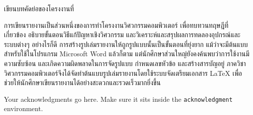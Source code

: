 \maketitle
\makesignature

\ifproject      
  \begin{abstractTH}      
    เขียนบทคัดย่อของโครงงานที่
    
    การเขียนรายงานเป็นส่วนหนึ่งของการทำโครงงานวิศวกรรมคอมพิวเตอร์
    เพื่อทบทวนทฤษฎีที่เกี่ยวข้อง อธิบายขั้นตอนวิธีแก้ปัญหาเชิงวิศวกรรม และวิเคราะห์และสรุปผลการทดลองอุปกรณ์และระบบต่างๆ
    \enskip อย่างไรก็ดี การสร้างรูปเล่มรายงานให้ถูกรูปแบบนั้นเป็นขั้นตอนที่ยุ่งยาก
    แม้ว่าจะมีต้นแบบสำหรับใช้ในโปรแกรม Microsoft Word แล้วก็ตาม
    แต่นักศึกษาส่วนใหญ่ยังคงค้นพบว่าการใช้งานมีความซับซ้อน และเกิดความผิดพลาดในการจัดรูปแบบ กำหนดเลขหัวข้อ และสร้างสารบัญอยู่
    \enskip ภาควิชาวิศวกรรมคอมพิวเตอร์จึงได้จัดทำต้นแบบรูปเล่มรายงานโดยใช้ระบบจัดเตรียมเอกสาร
    \LaTeX{} เพื่อช่วยให้นักศึกษาเขียนรายงานได้อย่างสะดวกและรวดเร็วมากยิ่งขึ้น
  \end{abstractTH}
  
  \begin{abstract}      
    The abstract would be placed here. It usually does not exceed 350 words
    long (not counting the heading), and must not take up more than one (1) page
    (even if fewer than 350 words long).
    
    Make sure your abstract sits inside the \texttt{abstract} environment.
  \end{abstract}
  
  %
  
  \begin{acknowledgments}      
    Your acknowledgments go here. Make sure it sits inside the
    \texttt{acknowledgment} environment.
    
  \end{acknowledgments}%
\fi %

\contentspage

\ifproject      
  \figurelistpage
  
  \tablelistpage
\fi %



